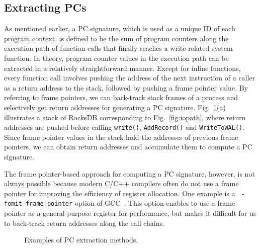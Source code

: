 \subsection{Extracting PCs}
\vspace{-5pt}
As mentioned earlier, a PC signature, which is used as a unique ID of each
program context, is defined to be the sum of program counters along the
execution path of function calls that finally reaches a write-related system
function.  In theory, program counter values in the execution path can be
extracted in a relatively straightforward manner.  Except for inline functions,
every function call involves pushing the address of the next instruction of a
caller as a return address to the stack, followed by pushing a frame pointer
value.  By referring to frame pointers, we can back-track stack frames of a
process and selectively get return addresses for generating a PC signature.
Fig.~\ref{fig:getpc}(a) illustrates a stack of RocksDB corresponding to
Fig.~\ref{fig:iopath}, where return addresses are pushed before calling
\texttt{write()}, \texttt{AddRecord()} and \texttt{WriteToWAL()}.  Since frame
pointer values in the stack hold the addresses of previous frame pointers, we
can obtain return addresses and accumulate them to compute a PC signature.  


The frame pointer-based approach for computing a PC signature, however, is not
always possible because modern C/C++ compilers often do not use a frame pointer
for improving the efficiency of register allocation.  One example is a {\tt
-fomit-frame-pointer} option of GCC~\cite{GCC}.  This option enables to use a frame
pointer as a general-purpose register for performance, but makes it difficult for us
to back-track return addresses along the call chains.  

\begin{figure}[t]
	\centering
	\hspace{10pt}
	\vspace{-9pt}
	\caption{Examples of PC extraction methods.}
	\label{fig:getpc}
	\vspace{-15pt}
\end{figure}

